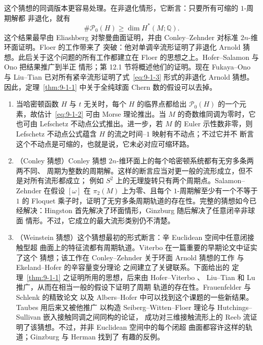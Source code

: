 这个猜想的同调版本更容易处理。在非退化情形，它断言：只要所有可缩的 $1$-周期解都
非退化，就有
\begin{equation}\label{eq:9-1-3}
  \#\mathcal P_0(H)\ge\dim H^*(M;\mathbb Q).
\end{equation}
这个结果最早由 Eliashberg  对黎曼曲面证明，并由 Conley--Zehnder
 对标准 $2n$-维环面证明。Floer  的工作带来了
突破：他对单调辛流形证明了非退化 Arnold 猜想。此后关于这个问题的所有工作都建立在
Floer 的思想之上。Hofer--Salamon  与 Ono  把结果推广到半正
情形；第 12.1 节将概述他们的证明。现在 Fukaya--Ono  与 Liu--Tian
 已对所有紧辛流形证明了式~\eqref{eq:9-1-3} 形式的非退化 Arnold 猜想。
因此，定理~\ref{thm:9-1-1} 中关于全纯球面 Chern 数的假设可以去掉。

\begin{remark}\label{rem:9-1-3}
\begin{enumerate}[label=\textnormal{(\roman*)}]
\item 当哈密顿函数 $H$ 与 $t$ 无关时，每个 $H$ 的临界点都给出
$\mathcal P_0(H)$ 的一个元素，故估计~\eqref{eq:9-1-2} 可由 Morse 理论推出。当 $M$
的奇数维同调为零时，它也可由 Lefschetz 不动点公式推出。进一步，若 $M$ 的 Euler
示性数非零，则 Lefschetz 不动点公式蕴含 $H$ 的流之时间--$1$ 映射有不动点；不过它并不
断言这个不动点是可缩的，也就是说，它未必对应可缩环路。

\item （Conley 猜想）Conley 猜想 $2n$-维环面上的每个哈密顿系统都有无穷多条两两不同、
周期为整数的周期解。这样的断言应当对更一般的流形成立，但不是对所有流形都成立；
例如 $S^2$ 上的无理旋转只有两个周期点。Salamon--Zehnder  在假设
$[\omega]$ 在 $\pi_2(M)$ 上为零、且每个 $1$-周期解至少有一个不等于 $1$ 的 Floquet
乘子时，证明了无穷多条周期轨道的存在性。完整的猜想如今已经解决：Hingston
 首先解决了环面情形，Ginzburg  随后解决了任意闭辛非球面
情形。不过，它成立的最大流形类别仍不清楚。

\item （Weinstein 猜想）这个猜想最初的形式断言：辛 Euclidean 空间中任意闭接触型超
曲面上的特征流都有周期轨道。Viterbo  在一篇重要的早期论文中证实了这个
猜想；该工作在 Conley--Zehnder 关于环面 Arnold 猜想的工作  与
Ekeland--Hofer 的辛容量变分理论  之间建立了关键联系。下面给出的
定理~\ref{thm:9-1-1} 之证明所用的思想，后来由 Hofer--Viterbo 、
Liu--Tian  和 Lu  推广，从而在相当一般的假设下证明了周期
轨道的存在性。Frauenfelder 与 Schlenk 的精致论文  以及 Albers--Hofer
 中可以找到这个课题的一些新结果。Taubes  用后来又被他推广
以构造 Seiberg--Witten--Floer 理论与 Hutchings--Sullivan 嵌入接触同调之间同构的论证，
成功对三维接触流形上的 Reeb 流证明了该猜想。不过，并非 Euclidean 空间中的每个闭超
曲面都容许这样的轨道；Ginzburg  与 Herman  找到了
有趣的反例。
\end{enumerate}
\end{remark}

